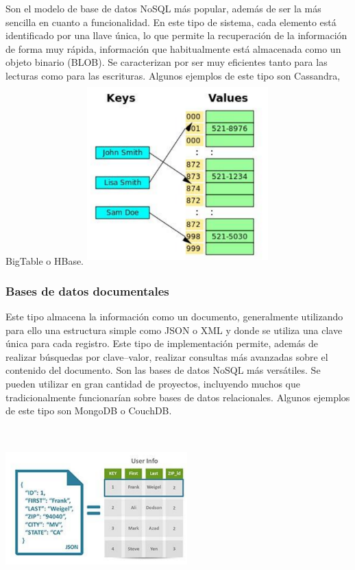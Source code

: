 \documentclass[twoside,twocolumn]{article}
\begin{document}
Son el modelo de base de datos NoSQL más popular, además de ser
 la más sencilla en cuanto a funcionalidad. En este tipo de sistema, 
 cada elemento está identificado por una llave única, lo que permite la
  recuperación de la información de forma muy rápida, información que 
  habitualmente está almacenada como un objeto binario (BLOB). Se caracterizan
   por ser muy eficientes tanto para las lecturas como para las escrituras.
    Algunos ejemplos de este tipo son Cassandra, BigTable o HBase.
    \includegraphics[width=7cm, height=7cm]{imagenes/img1.png}

\subsubsection{Bases de datos documentales}
Este tipo almacena la información como un documento,
generalmente utilizando para ello una estructura simple 
como JSON o XML y donde se utiliza una clave única para
cada registro. Este tipo de implementación permite, además
de realizar búsquedas por clave–valor, realizar consultas más
avanzadas sobre el contenido del documento. Son las bases de 
datos NoSQL más versátiles. Se pueden utilizar en gran cantidad 
de proyectos, incluyendo muchos que tradicionalmente funcionarían
sobre bases de datos relacionales. Algunos ejemplos de este tipo 
son MongoDB o CouchDB.
\includegraphics[width=7cm, height=7cm]{imagenes/img2.png}
\end{document}
